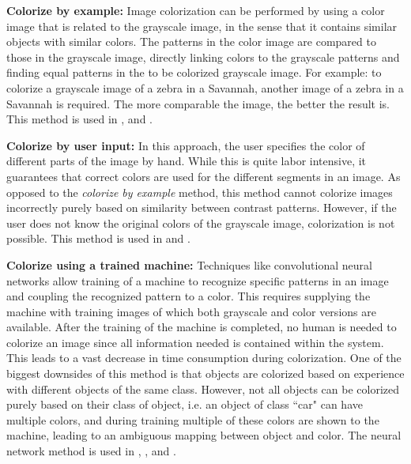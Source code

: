 \textbf{Colorize by example:} Image colorization can be performed by using a color image that is related to the grayscale image, in the sense that it contains similar objects with similar colors. The patterns in the color image are compared to those in the grayscale image, directly linking colors to the grayscale patterns and finding equal patterns in the to be colorized grayscale image. 
For example: to colorize a grayscale image of a zebra in a Savannah, another image of a zebra in a Savannah is required. The more comparable the image, the better the result is. This method is used in \cite{Charpiat}, \cite{Gupta} and \cite{Zheng}.

\textbf{Colorize by user input:} In this approach, the user specifies the color of different parts of the image by hand. While this is quite labor intensive, it guarantees that correct colors are used for the different segments in an image. 
As opposed to the \textit{colorize by example} method, this method cannot colorize images incorrectly purely based on similarity between contrast patterns. However, if the user does not know the original colors of the grayscale image, colorization is not possible. This method is used in \cite{Horiuchi} and \cite{Levin}.

\textbf{Colorize using a trained machine:} Techniques like convolutional neural networks allow training of a machine to recognize specific patterns in an image and coupling the recognized pattern to a color. This requires supplying the machine with training images of which both grayscale and color versions are available. 
After the training of the machine is completed, no human is needed to colorize an image since all information needed is contained within the system. This leads to a vast decrease in time consumption during colorization. One of the biggest downsides of this method is that objects are colorized based on experience with different objects of the same class. 
However, not all objects can be colorized purely based on their class of object, i.e. an object of class ``car" can have multiple colors, and during training multiple of these colors are shown to the machine, leading to an ambiguous mapping between object and color. The neural network method is used in \cite{Cheng}, \cite{Ho}, \cite{Krizhevsky} and \cite{Dahl}.\\

